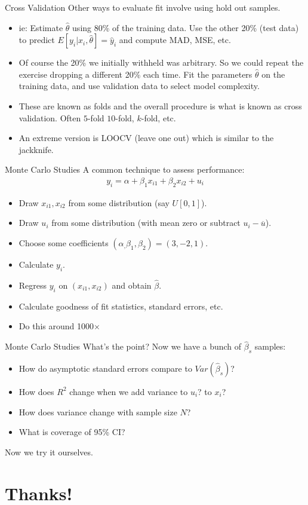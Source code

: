 \documentclass[aspectratio=169]{beamer}
\begin{document}
\begin{frame}{Cross Validation}
Other ways to evaluate fit involve using \alert{hold out} samples. 
\begin{itemize}
\item ie: Estimate $\hat{\theta}$ using 80\% of the \alert{training} data. Use the other 20\% (\alert{test data}) to predict $E[y_i | x_i, \widehat{\theta}]=\hat{y}_i$ and compute MAD, MSE, etc.
\item Of course the 20\% we initially withheld was arbitrary. So we could repeat the exercise dropping a different 20\% each time. Fit the parameters $\widehat{\theta}$ on the training data, and use \alert{validation data} to select model complexity.
\item These are known as \alert{folds} and the overall procedure is what is known as \alert{cross validation}. Often $5$-fold $10$-fold, $k$-fold, etc.
\item An extreme version is LOOCV (leave one out) which is similar to the jackknife.
\end{itemize}
\end{frame}

\begin{frame}{Monte Carlo Studies}
A common technique to assess performance:
\begin{align*}
y_i = \alpha + \beta_1 x_{i1} + \beta_2 x_{i2} + u_i
\end{align*}
\begin{itemize}
\item Draw $x_{i1},x_{i2}$ from some distribution (say $U[0,1]$).
\item Draw $u_i$ from some distribution (with mean zero or subtract $u_i - \overline{u}$).
\item Choose some coefficients $(\alpha_,\beta_1,\beta_2) = (3,-2,1)$.
\item Calculate $y_i$.
\item Regress $y_i$ on $(x_{i1},x_{i2})$ and obtain $\widehat{\beta}$.
\item Calculate goodness of fit statistics, standard errors, etc.
\item Do this around 1000$\times$
\end{itemize}
\end{frame}

\begin{frame}{Monte Carlo Studies}
What's the point? Now we have a bunch of $\widehat{\beta}_s$ samples:
\begin{itemize}
\item How do asymptotic standard errors compare to $Var(\widehat{\beta}_s)$?
\item How does $R^2$ change when we add variance to $u_i$? to $x_i$?
\item How does variance change with sample size $N$?
\item What is \alert{coverage} of 95\% CI?
\end{itemize}
Now we try it ourselves.
\end{frame}



\section*{Thanks!}
\end{document}
